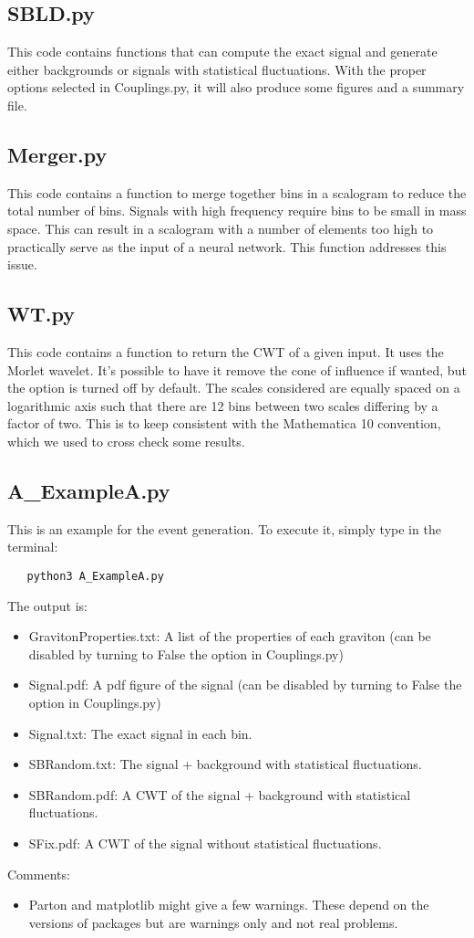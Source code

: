 \documentclass{article}
\begin{document}
\subsection{SBLD.py}
This code contains functions that can compute the exact signal and generate either backgrounds or signals with statistical fluctuations. With the proper options selected in Couplings.py, it will also produce some figures and a summary file.

\subsection{Merger.py}
This code contains a function to merge together bins in a scalogram to reduce the total number of bins. Signals with high frequency require bins to be small in mass space. This can result in a scalogram with a number of elements too high to practically serve as the input of a neural network. This function addresses this issue.

\subsection{WT.py}
This code contains a function to return the CWT of a given input. It uses the Morlet wavelet. It's possible to have it remove the cone of influence if wanted, but the option is turned off by default. The scales considered are equally spaced on a logarithmic axis such that there are 12 bins between two scales differing by a factor of two. This is to keep consistent with the Mathematica 10 convention, which we used to cross check some results.

\subsection{A\_ExampleA.py}
This is an example for the event generation. To execute it, simply type in the terminal:
\begin{verbatim}
   python3 A_ExampleA.py
\end{verbatim}
The output is:
\begin{itemize}
  \item GravitonProperties.txt: A list of the properties of each graviton (can be disabled by turning to False the option in Couplings.py)
  \item Signal.pdf: A pdf figure of the signal (can be disabled by turning to False the option in Couplings.py)
  \item Signal.txt: The exact signal in each bin.
  \item SBRandom.txt: The signal + background with statistical fluctuations.
  \item SBRandom.pdf: A CWT of the signal + background with statistical fluctuations.
  \item SFix.pdf: A CWT of the signal without statistical fluctuations.
\end{itemize}
Comments:
\begin{itemize}
  \item Parton and matplotlib might give a few warnings. These depend on the versions of packages but are warnings only and not real problems.
\end{itemize}
\end{document}
